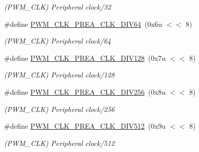 \begin{DoxyCompactItemize}
\begin{DoxyCompactList}\small\item\em (P\+W\+M\+\_\+\+C\+LK) Peripheral clock/32 \end{DoxyCompactList}\item 
\mbox{\label{group__SAME70__PWM_ga178e412966e10c888eac32104042a581}} 
\#define \mbox{\hyperlink{group__SAME70__PWM_ga178e412966e10c888eac32104042a581}{P\+W\+M\+\_\+\+C\+L\+K\+\_\+\+P\+R\+E\+A\+\_\+\+C\+L\+K\+\_\+\+D\+I\+V64}}~(0x6u $<$$<$ 8)
\begin{DoxyCompactList}\small\item\em (P\+W\+M\+\_\+\+C\+LK) Peripheral clock/64 \end{DoxyCompactList}\item 
\mbox{\label{group__SAME70__PWM_ga8dcee1a03b78b3780326312cee74a047}} 
\#define \mbox{\hyperlink{group__SAME70__PWM_ga8dcee1a03b78b3780326312cee74a047}{P\+W\+M\+\_\+\+C\+L\+K\+\_\+\+P\+R\+E\+A\+\_\+\+C\+L\+K\+\_\+\+D\+I\+V128}}~(0x7u $<$$<$ 8)
\begin{DoxyCompactList}\small\item\em (P\+W\+M\+\_\+\+C\+LK) Peripheral clock/128 \end{DoxyCompactList}\item 
\mbox{\label{group__SAME70__PWM_ga2b6c73e5a4deebd5e429bd3aaadf837b}} 
\#define \mbox{\hyperlink{group__SAME70__PWM_ga2b6c73e5a4deebd5e429bd3aaadf837b}{P\+W\+M\+\_\+\+C\+L\+K\+\_\+\+P\+R\+E\+A\+\_\+\+C\+L\+K\+\_\+\+D\+I\+V256}}~(0x8u $<$$<$ 8)
\begin{DoxyCompactList}\small\item\em (P\+W\+M\+\_\+\+C\+LK) Peripheral clock/256 \end{DoxyCompactList}\item 
\mbox{\label{group__SAME70__PWM_gaf721401087a93bac5aeb4bf8a9ac235e}} 
\#define \mbox{\hyperlink{group__SAME70__PWM_gaf721401087a93bac5aeb4bf8a9ac235e}{P\+W\+M\+\_\+\+C\+L\+K\+\_\+\+P\+R\+E\+A\+\_\+\+C\+L\+K\+\_\+\+D\+I\+V512}}~(0x9u $<$$<$ 8)
\begin{DoxyCompactList}\small\item\em (P\+W\+M\+\_\+\+C\+LK) Peripheral clock/512 \end{DoxyCompactList}\item 
\mbox{\label{group__SAME70__PWM_ga4ac8af0adc0d5842914af03ef91e93ce}} 

\end{DoxyCompactItemize}
